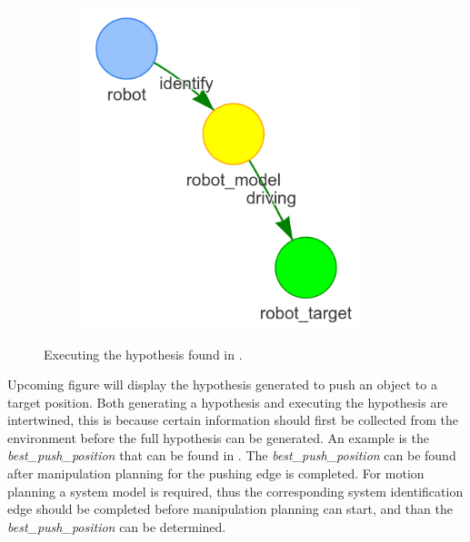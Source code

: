 \begin{figure}[H]
\begin{subfigure}{.3\textwidth}
    \end{subfigure}
    \begin{subfigure}{.3\textwidth}
    \centering
    \includegraphics[width=0.9\textwidth]{figures/connecting_nodes/robot_to_target/execute_robot_to_target_3}
    \end{subfigure}
    \caption{Executing the hypothesis found in .}
    \label{fig:execute_robot_to_target}
\end{figure}

Upcoming figure will display the hypothesis generated to push an object to a target position. Both generating a hypothesis and executing the hypothesis are intertwined, this is because certain information should first be collected from the environment before the full hypothesis can be generated. An example is the \textit{best\_push\_position} that can be found in . The \textit{best\_push\_position} can be found after manipulation planning for the pushing edge is completed. For motion planning a system model is required, thus the corresponding system identification edge should be completed before manipulation planning can start, and than the \textit{best\_push\_position} can be determined.\bs

